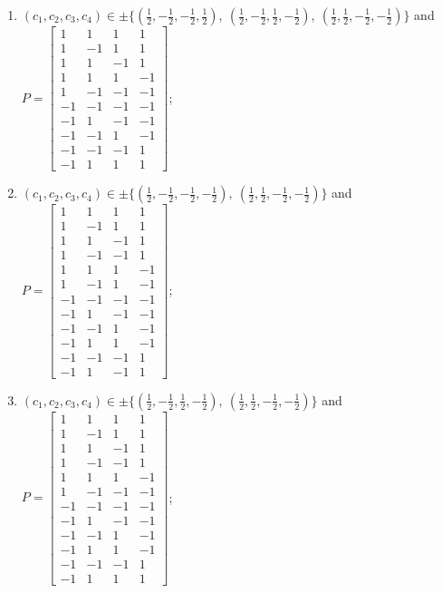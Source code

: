 \begin{enumerate}
\item[(e11)\,\newitem] $(c_1,c_2,c_3,c_4)\in \pm\{(\tfrac{1}{2},-\tfrac{1}{2},-\tfrac{1}{2},\tfrac{1}{2}),\allowbreak\ (\tfrac{1}{2},-\tfrac{1}{2},\tfrac{1}{2},-\tfrac{1}{2}),\allowbreak\ (\tfrac{1}{2},\tfrac{1}{2},-\tfrac{1}{2},-\tfrac{1}{2})\}$ and $P=\begin{bmatrix}1&1&1&1\\1&-1&1&1\\1&1&-1&1\\1&1&1&-1\\1&-1&-1&-1\\-1&-1&-1&-1\\-1&1&-1&-1\\-1&-1&1&-1\\-1&-1&-1&1\\-1&1&1&1\end{bmatrix}$;
\item[(e12)\,\newitem] $(c_1,c_2,c_3,c_4)\in \pm\{(\tfrac{1}{2},-\tfrac{1}{2},-\tfrac{1}{2},-\tfrac{1}{2}),\allowbreak\ (\tfrac{1}{2},\tfrac{1}{2},-\tfrac{1}{2},-\tfrac{1}{2})\}$ and $P=\begin{bmatrix}1&1&1&1\\1&-1&1&1\\1&1&-1&1\\1&-1&-1&1\\1&1&1&-1\\1&-1&1&-1\\-1&-1&-1&-1\\-1&1&-1&-1\\-1&-1&1&-1\\-1&1&1&-1\\-1&-1&-1&1\\-1&1&-1&1\end{bmatrix}$;
\item[(e13)\,\newitem] $(c_1,c_2,c_3,c_4)\in \pm\{(\tfrac{1}{2},-\tfrac{1}{2},\tfrac{1}{2},-\tfrac{1}{2}),\allowbreak\ (\tfrac{1}{2},\tfrac{1}{2},-\tfrac{1}{2},-\tfrac{1}{2})\}$ and $P=\begin{bmatrix}1&1&1&1\\1&-1&1&1\\1&1&-1&1\\1&-1&-1&1\\1&1&1&-1\\1&-1&-1&-1\\-1&-1&-1&-1\\-1&1&-1&-1\\-1&-1&1&-1\\-1&1&1&-1\\-1&-1&-1&1\\-1&1&1&1\end{bmatrix}$;

\end{enumerate}
